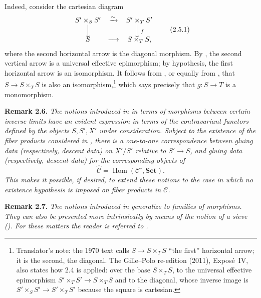 Indeed, consider the cartesian diagram
\[
\begin{array}{ccc}
  S'\times_SS' & \xrightarrow{\sim} & S'\times_TS' \\
  \Big\downarrow & & \Big\downarrow\,\scriptstyle f \\[-0.25em]
  S & \longrightarrow & S\times_TS ,
\end{array}
\tag{2.5.1}\label{sga3:iv:corollary:2:5:eq:2:5:1:01}
\]
where the second horizontal arrow is the diagonal morphism. By , the
second vertical arrow is a universal effective epimorphism; by
hypothesis, the first horizontal arrow is an isomorphism. It follows from
, or equally from , that
\(S\to S\times_TS\) is also an isomorphism,\footnote{Translator's note: the 1970 text calls \(S\to S\times_TS\)
``the first'' horizontal arrow; it is the second, the diagonal. The
Gille--Polo re-edition (2011), Expos\'e~IV, also states how 2.4 is applied:
over the base \(S\times_TS\), to the universal effective epimorphism
\(S'\times_TS'\to S\times_TS\) and to the diagonal, whose inverse image is
\(S'\times_SS'\to S'\times_TS'\) because the square is cartesian.} which says precisely that
\(g:S\to T\) is a monomorphism.

\medskip
\noindent{}\textbf{Remark 2.6.}
\textit{The notions introduced in  in terms of morphisms between certain
inverse limits have an evident expression in terms of the contravariant
functors defined by the objects \(S,S',X'\) under consideration. Subject to
the existence of the fiber products considered in , there is a one-to-one
correspondence between gluing data (respectively, descent data) on \(X'/S'\)
relative to \(S'\to S\), and gluing data (respectively, descent data) for the
corresponding objects of}
\[
  \widehat{\mathscr C}
  =\operatorname{Hom}(\mathscr C^{\circ},\mathbf{Set}).
\]
\textit{This makes it possible, if desired, to extend these notions to the
case in which no existence hypothesis is imposed on fiber products in
\(\mathscr C\).}

\medskip
\noindent{}\textbf{Remark 2.7.}
\textit{The notions introduced in  generalize to families of
morphisms. They can also be presented more intrinsically by means of the
notion of a sieve (). For these matters the reader is referred to .}
